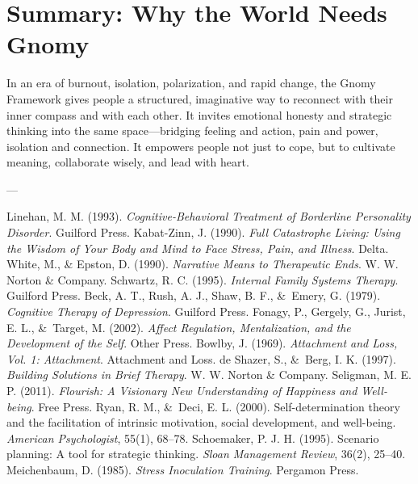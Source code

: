 \documentclass{article}
\begin{document}
\section{Summary: Why the World Needs Gnomy}
In an era of burnout, isolation, polarization, and rapid change, the Gnomy Framework gives people a structured, imaginative way to reconnect with their inner compass and with each other. It invites emotional honesty and strategic thinking into the same space—bridging feeling and action, pain and power, isolation and connection. It empowers people not just to cope, but to cultivate meaning, collaborate wisely, and lead with heart.

---

\begin{thebibliography}{99}
     Linehan, M. M. (1993). \textit{Cognitive-Behavioral Treatment of Borderline Personality Disorder}. Guilford Press.
     Kabat-Zinn, J. (1990). \textit{Full Catastrophe Living: Using the Wisdom of Your Body and Mind to Face Stress, Pain, and Illness}. Delta.
     White, M., \& Epston, D. (1990). \textit{Narrative Means to Therapeutic Ends}. W. W. Norton \& Company.
     Schwartz, R. C. (1995). \textit{Internal Family Systems Therapy}. Guilford Press.
     Beck, A. T., Rush, A. J., Shaw, B. F., \&\ Emery, G. (1979). \textit{Cognitive Therapy of Depression}. Guilford Press.
     Fonagy, P., Gergely, G., Jurist, E. L., \&\ Target, M. (2002). \textit{Affect Regulation, Mentalization, and the Development of the Self}. Other Press.
     Bowlby, J. (1969). \textit{Attachment and Loss, Vol. 1: Attachment}. Attachment and Loss.
     de Shazer, S., \&\ Berg, I. K. (1997). \textit{Building Solutions in Brief Therapy}. W. W. Norton \& Company.
     Seligman, M. E. P. (2011). \textit{Flourish: A Visionary New Understanding of Happiness and Well-being}. Free Press.
     Ryan, R. M., \&\ Deci, E. L. (2000). Self-determination theory and the facilitation of intrinsic motivation, social development, and well-being. \textit{American Psychologist}, 55(1), 68–78.
     Schoemaker, P. J. H. (1995). Scenario planning: A tool for strategic thinking. \textit{Sloan Management Review}, 36(2), 25–40.
     Meichenbaum, D. (1985). \textit{Stress Inoculation Training}. Pergamon Press.

\end{thebibliography}
\end{document}
